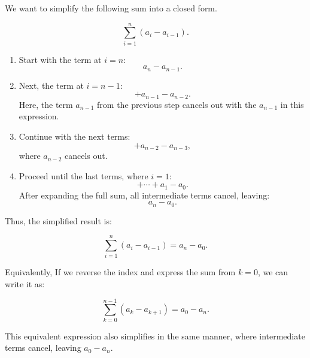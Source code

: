     \begin{example}
        We want to simplify the following sum into a closed form.

        \[
        \sum_{i=1}^{n} (a_i - a_{i-1}).
        \]

        \begin{enumerate}
            \item Start with the term at \( i = n \):
            \[
            a_n - a_{n-1}.
            \]

            \item Next, the term at \( i = n-1 \):
            \[
            + a_{n-1} - a_{n-2}.
            \]
            Here, the term \( a_{n-1} \) from the previous step cancels out with the \( a_{n-1} \) in this expression.

            \item Continue with the next terms:
            \[
            + a_{n-2} - a_{n-3},
            \]
            where \( a_{n-2} \) cancels out.

            \item Proceed until the last terms, where \( i = 1 \):
            \[
            + \cdots + a_1 - a_0.
            \]
            After expanding the full sum, all intermediate terms cancel, leaving:
            \[
            a_n - a_0.
            \]
        \end{enumerate}

        Thus, the simplified result is:

        \[
        \sum_{i=1}^{n} (a_i - a_{i-1}) = a_n - a_0.
        \]

        Equivalently, If we reverse the index and express the sum from \( k = 0 \), we can write it as:

        \[
        \sum_{k=0}^{n-1} (a_k - a_{k+1}) = a_0 - a_n.
        \]

        This equivalent expression also simplifies in the same manner, where intermediate terms cancel, leaving \( a_0 - a_n \).
    \end{example}

